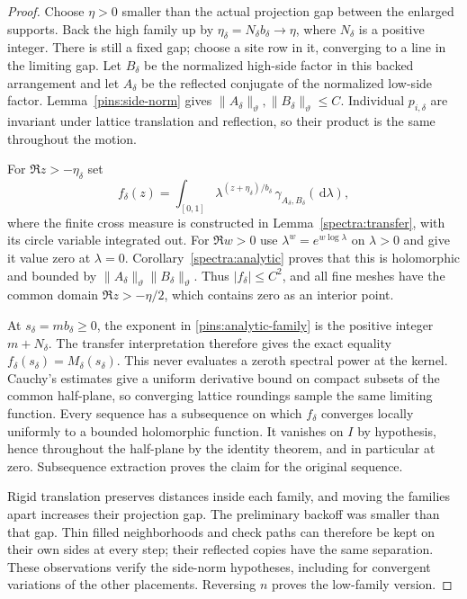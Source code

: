 \documentclass[11pt]{article}
\newcommand{\dd}{\,\mathrm d}
\theoremstyle{definition}
\theoremstyle{remark}
\numberwithin{equation}{section}
\begin{document}
\begin{proof}
Choose $\eta>0$ smaller than the actual projection gap between the
enlarged supports.  Back the high family up by
$\eta_\delta=N_\delta b_\delta\to\eta$, where $N_\delta$ is a
positive integer.  There is still a fixed gap; choose a site row in
it, converging to a line in the limiting gap.  Let $B_\delta$ be the
normalized high-side factor in this backed arrangement and let
$A_\delta$ be the reflected conjugate of the normalized low-side
factor.  Lemma~\ref{pins:side-norm} gives
$\|A_\delta\|_\vartheta,\|B_\delta\|_\vartheta\le C$.
Individual $p_{i,\delta}$ are invariant under lattice translation
and reflection, so their product is the same throughout the motion.

For $\Re z>-\eta_\delta$ set
\begin{equation}\label{pins:analytic-family}
 f_\delta(z)=\int_{[0,1]}
 \lambda^{(z+\eta_\delta)/b_\delta}\,
             \gamma_{A_\delta,B_\delta}(\dd\lambda),
\end{equation}
where the finite cross measure is constructed in
Lemma~\ref{spectra:transfer}, with its circle variable integrated out.
For $\Re w>0$ use $\lambda^w=e^{w\log\lambda}$ on $\lambda>0$
and give it value zero at $\lambda=0$.
Corollary~\ref{spectra:analytic} proves that this is holomorphic and
bounded by $\|A_\delta\|_\vartheta\|B_\delta\|_\vartheta$.
Thus $|f_\delta|\le C^2$, and all fine
meshes have the common domain $\Re z>-\eta/2$, which contains zero
as an interior point.

At $s_\delta=m b_\delta\ge0$, the exponent in
\eqref{pins:analytic-family} is the positive integer $m+N_\delta$.
The transfer interpretation therefore gives the exact equality
$f_\delta(s_\delta)=M_\delta(s_\delta)$.  This never evaluates a
zeroth spectral power at the kernel.  Cauchy's estimates give a
uniform derivative bound on compact subsets of the common half-plane,
so converging lattice roundings sample the same limiting function.
Every sequence has a subsequence on which $f_\delta$ converges locally
uniformly to a bounded holomorphic function.  It vanishes on $I$ by
hypothesis, hence throughout the half-plane by the identity theorem,
and in particular at zero.  Subsequence extraction proves the claim
for the original sequence.

Rigid translation preserves distances inside each family, and moving
the families apart increases their projection gap.  The preliminary
backoff was smaller than that gap.  Thin filled neighborhoods and
check paths can therefore be kept on their own sides at every step;
their reflected copies have the same separation.  These observations
verify the side-norm hypotheses, including for convergent variations of
the other placements.  Reversing $n$ proves the low-family version.
\end{proof}
\end{document}
